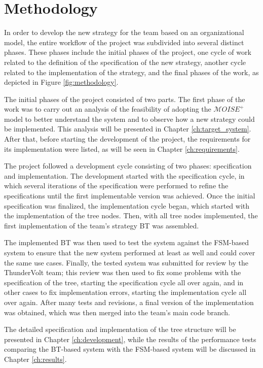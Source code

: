 \def \MOISEp {$\mathcal{M}OISE^+$} 

\chapter{Methodology}
\label{ch:methodology}

In order to develop the new strategy for the team based on an organizational model, the entire workflow of the project was subdivided into several distinct phases. These phases include the initial phases of the project, one cycle of work related to the definition of the specification of the new strategy, another cycle related to the implementation of the strategy, and the final phases of the work, as depicted in Figure \ref{fig:methodology}.

The initial phases of the project consisted of two parts. The first phase of the work was to carry out an analysis of the feasibility of adopting the \MOISEp \cite{MOISEp} model to better understand the system and to observe how a new strategy could be implemented. This analysis will be presented in Chapter \ref{ch:target_system}. After that, before starting the development of the project, the requirements for its implementation were listed, as will be seen in Chapter \ref{ch:requirements}.

The project followed a development cycle consisting of two phases: specification and implementation. The development started with the specification cycle, in which several iterations of the specification were performed to refine the specifications until the first implementable version was achieved. Once the initial specification was finalized, the implementation cycle began, which started with the implementation of the tree nodes. Then, with all tree nodes implemented, the first implementation of the team's strategy BT was assembled. 

The implemented BT was then used to test the system against the FSM-based system to ensure that the new system performed at least as well and could cover the same use cases. Finally, the tested system was submitted for review by the ThunderVolt team; this review was then used to fix some problems with the specification of the tree, starting the specification cycle all over again, and in other cases to fix implementation errors, starting the implementation cycle all over again. After many tests and revisions, a final version of the implementation was obtained, which was then merged into the team's main code branch. 

The detailed specification and implementation of the tree structure will be presented in Chapter \ref{ch:development}, while the results of the performance tests comparing the BT-based system with the FSM-based system will be discussed in Chapter \ref{ch:results}.

